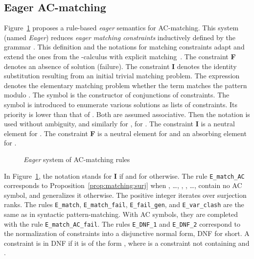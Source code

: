 \documentclass[submission,copyright,creativecommons]{eptcs}
\numberwithin{subcase}{case}
\begin{document}
\subsection{Eager AC-matching}
Figure~\ref{Eager:Matching-AC} proposes a rule-based \emph{eager} semantics for
AC-matching. This system (named \textit{Eager}) reduces \emph{eager matching
constraints} inductively defined by the grammar .
This definition and the notations for matching constraints adapt and extend  the
ones from the -calculus with explicit matching~\cite{CFK07}. The
constraint \textbf{F} denotes
 an absence of solution (failure). The constraint \textbf{I} denotes the
 identity substitution resulting from an initial trivial matching problem. The
 expression  denotes the
elementary matching problem whether the term  matches the pattern  modulo
. The symbol  is the constructor of conjunctions of
 constraints. The symbol  is introduced to enumerate various solutions as
 lists of constraints. Its priority is lower than that of . Both are
 assumed associative. Then the notation  is used
 without ambiguity, and similarly for , for . The constraint
 \textbf{I} is a neutral element for . The constraint \textbf{F} is a
 neutral element for  and an absorbing element for .

 \begin{figure}[hbt!]
\setlength{\abovecaptionskip}{-0.2cm}
\setlength{\belowcaptionskip}{-0.1cm}

\caption{\textit{Eager} system of AC-matching rules \label{Eager:Matching-AC}}
\end{figure}

In Figure~\ref{Eager:Matching-AC}, the notation  stands for \textbf{I} if  and for  otherwise. The rule \texttt{E\_match\_AC}
corresponds to Proposition~\ref{prop:matching:surj} when , \ldots, ,
, \ldots,  contain no AC symbol, and generalizes it otherwise.  The
positive integer  iterates over surjection ranks. The rules \texttt{E\_match},
\texttt{E\_match\_fail}, \texttt{E\_fail\_gen}, and \texttt{E\_var\_clash} are
the same as in syntactic pattern-matching. With AC symbols, they are completed
with the rule \texttt{E\_match\_AC\_fail}. The rules \texttt{E\_DNF\_1} and
\texttt{E\_DNF\_2} correspond to the normalization of constraints into a
disjunctive normal form, DNF for short. A constraint is in DNF if it is of
the form , where  is a constraint not
containing  and .
\end{document}

